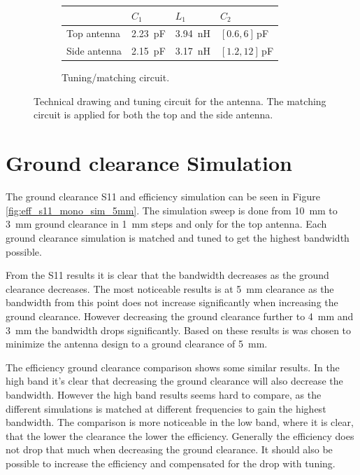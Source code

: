 \begin{figure}[htbp]
\begin{subfigure}[b]{0.49\linewidth}
\begin{tabular}{|l|l|l|l|}
            \hline
            & $C_1$ & $L_1$ & $C_2$ \\
            \hline
            Top antenna & \SI{2.23}{pF} & \SI{3.94}{nH} & $[0.6,6]\,$pF\\
            Side antenna & \SI{2.15}{pF} & \SI{3,17}{nH} & $[1.2,12]\,$pF\\
            \hline
        \end{tabular}
        \caption{Tuning/matching circuit.}
        \label{fig:ant1_tuning}
    \end{subfigure}
    \caption{Technical drawing and tuning circuit for the antenna.  The matching circuit is applied for both the top and the side antenna.}
    \label{fig:ant1techschem_6pf}
\end{figure}

\FloatBarrier
\section{Ground clearance Simulation}
The ground clearance S11 and efficiency simulation can be seen in Figure \ref{fig:eff_s11_mono_sim_5mm}.
The simulation sweep is done from \SI{10}{mm} to \SI{3}{mm} ground clearance in \SI{1}{mm} steps and only for the top antenna. Each ground clearance simulation is matched and tuned to get the highest bandwidth possible.

From the S11 results it is clear that the bandwidth decreases as the ground clearance decreases. The most noticeable results is at \SI{5}{mm} clearance as the bandwidth from this point does not increase significantly when increasing the ground clearance. However decreasing the ground clearance further to \SI{4}{mm} and \SI{3}{mm} the bandwidth drops significantly. Based on these results is was chosen to minimize the antenna design to a ground clearance of \SI{5}{mm}.

The efficiency ground clearance comparison shows some similar results. In the high band it's clear that decreasing the ground clearance will also decrease the bandwidth. However the high band results seems hard to compare, as the different simulations is matched at different frequencies to gain the highest bandwidth. The comparison is more noticeable in the low band, where it is clear, that the lower the clearance the lower the efficiency. Generally the efficiency does not drop that much when decreasing the ground clearance. It should also be possible to increase the efficiency and compensated for the drop with tuning.  

